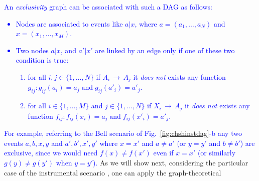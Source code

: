 \documentclass[letterpaper]{article}
\newcommand{\et}{\;\mathrm{and}\;}
\begin{document}
\textcolor{blue}{
An \emph{exclusivity} graph can be associated with such a DAG
as follows:
\begin{itemize}
    \item Nodes are associated to events like $a | x$, where $a = (a_1,\ldots,a_N)$ and  $x = (x_1,\ldots,x_M)$.
    \item Two nodes $a | x $, and $a' | x'$ are linked by an edge only if one of these two condition is true:
        \begin{enumerate}
            \item for all $i,j \in \{1 ,\ldots,N\}$ if $A_i\,
                \rightarrow\, A_j$ it \emph{does not} exists any function $g_{ij} : g_{ij}(a_i) = a_j
                \et g_{ij}(a'_i) = a'_j$.
            \item for all $i\in \{1,\ldots,M\}$ and $j\in \{1,\ldots,N\}$ if
                $X_i\,\rightarrow\,A_j$ it \emph{does not} exists any function $f_{ij} : f_{ij}(x_i) = a_j
                \et f_{ij}(x'_i) = a'_j$.
        \end{enumerate}
\end{itemize}
}
\textcolor{blue}{
For example, referring to the Bell scenario of
Fig.~\ref{fig:chshinstdag}-b any two events $a,b,x,y$ and $a',b',x',y'$
where $x = x'$ and $a\neq a'$ (or $y = y'$ and $b \neq b'$) are exclusive,
since we would need $f(x) \neq f(x')$ even if $x = x'$ (or similarly $g(y)
\neq g(y')$ when $y = y'$).
}
As we will show next, considering the particular case of the instrumental
scenario \cite{pearl1995, bonet2001}, one can apply the graph-theoretical
\end{document}
